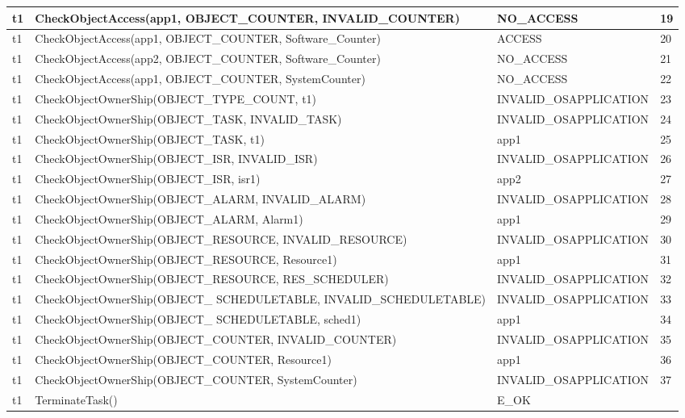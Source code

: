\documentclass[10pt]{article}
\newlength{\Li}\settowidth{\Li}{Running}
\newlength{\Lii}\setlength{\Lii}{7cm}
\newlength{\Liiii}\setlength{\Liiii}{0.9cm}
\newlength{\Liii}\setlength{\Liii}{\textwidth} \addtolength{\Liii}{-\Li} \addtolength{\Liii}{-\Lii} \addtolength{\Liii}{-\Liiii}
\begin{document}
\begin{supertabular}{|p{\Li}|p{\Lii}|p{\Liii}|p{\Liiii}|}
	t1		& CheckObjectAccess(app1, OBJECT\_COUNTER, INVALID\_COUNTER)			& NO\_ACCESS					& 19 \\ \hline
	t1		& CheckObjectAccess(app1, OBJECT\_COUNTER, Software\_Counter)				& ACCESS						& 20 \\ \hline
	t1		& CheckObjectAccess(app2, OBJECT\_COUNTER, Software\_Counter)				& NO\_ACCESS					& 21 \\ \hline
	t1		& CheckObjectAccess(app1, OBJECT\_COUNTER, SystemCounter)				& NO\_ACCESS					& 22 \\ \hline
	
	t1		& CheckObjectOwnerShip(OBJECT\_TYPE\_COUNT, t1)							& INVALID\_OSAPPLICATION			& 23 \\ \hline
	t1		& CheckObjectOwnerShip(OBJECT\_TASK, INVALID\_TASK)						& INVALID\_OSAPPLICATION			& 24 \\ \hline
	t1		& CheckObjectOwnerShip(OBJECT\_TASK, t1)								& app1							& 25 \\ \hline
	
	t1		& CheckObjectOwnerShip(OBJECT\_ISR, INVALID\_ISR)						& INVALID\_OSAPPLICATION			& 26 \\ \hline
	t1		& CheckObjectOwnerShip(OBJECT\_ISR, isr1)								& app2							& 27 \\ \hline
	
	t1		& CheckObjectOwnerShip(OBJECT\_ALARM, INVALID\_ALARM)					& INVALID\_OSAPPLICATION			& 28 \\ \hline
	t1		& CheckObjectOwnerShip(OBJECT\_ALARM, Alarm1)							& app1							& 29 \\ \hline
	
	t1		& CheckObjectOwnerShip(OBJECT\_RESOURCE, INVALID\_RESOURCE)			& INVALID\_OSAPPLICATION			& 30 \\ \hline
	t1		& CheckObjectOwnerShip(OBJECT\_RESOURCE, Resource1)					& app1							& 31 \\ \hline
	t1		& CheckObjectOwnerShip(OBJECT\_RESOURCE, RES\_SCHEDULER)			& INVALID\_OSAPPLICATION			& 32 \\ \hline
	
	t1		& CheckObjectOwnerShip(OBJECT\_ SCHEDULETABLE, INVALID\_SCHEDULETABLE)	& INVALID\_OSAPPLICATION			& 33 \\ \hline
	t1		& CheckObjectOwnerShip(OBJECT\_ SCHEDULETABLE, sched1)					& app1							& 34 \\ \hline
	
	t1		& CheckObjectOwnerShip(OBJECT\_COUNTER, INVALID\_COUNTER)				& INVALID\_OSAPPLICATION			& 35 \\ \hline
	t1		& CheckObjectOwnerShip(OBJECT\_COUNTER, Resource1)						& app1							& 36 \\ \hline
	t1		& CheckObjectOwnerShip(OBJECT\_COUNTER, SystemCounter)					& INVALID\_OSAPPLICATION			& 37 \\ \hline	
	t1		& TerminateTask()														& E\_OK							& \\ \hline
	\end{supertabular}\\
\end{document}
